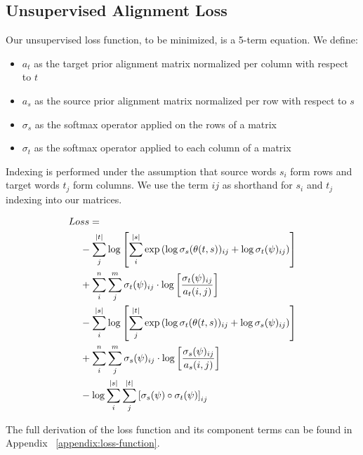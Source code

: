 \documentclass[twoside,twocolumn]{article}
\begin{document}
\subsection{Unsupervised Alignment Loss}


Our unsupervised loss function, to be minimized, is a 5-term equation.
We define:
\begin{itemize}[label={}]
  \item $a_t$ as the target prior alignment matrix normalized per column with respect to $t$\\ %
  \item $a_s$ as the source prior alignment matrix normalized per row with respect to $s$\\ %
  \item $\sigma_s$ as the softmax operator applied on the rows of a matrix\\
  \item $\sigma_t$ as the softmax operator applied to each column of a matrix
\end{itemize}

Indexing is performed under the assumption that source words $s_i$ form rows
and target words $t_j$ form columns. We use the term $ij$ as shorthand
for $s_i$ and $t_j$ indexing into our matrices.

\begin{equation}
  \centering
\begin{split}
  Lo&ss = \\
  &- \sum_j^{|t|} \log \left[
      \sum_i^{|s|} \exp \left(
        \log \sigma_s(\theta(t, s))_{ij} + \log \sigma_t(\psi)_{ij} \right)
    \right] \\
  &+ \sum_i^n \sum_j^m \sigma_t(\psi)_{ij} \cdot \log \left[
    \frac{\sigma_t(\psi)_{ij}}{a_t(i, j)} \right] \\
  &- \sum_i^{|s|} \log \left[ \sum_j^{|t|}
      \exp \left(
        \log \sigma_t(\theta(t, s))_{ij} + \log \sigma_s(\psi)_{ij}
      \right)
    \right] \\
  &+ \sum_i^n \sum_j^m \sigma_s(\psi)_{ij} \cdot \log \left[
    \frac{\sigma_s(\psi)_{ij}}{a_s(i, j)} \right] \\
  &- \log \sum_i^{|s|} \sum_j^{|t|} \left[
    \sigma_s(\psi) \circ \sigma_t(\psi) \right]_{ij} \\
\end{split}
\end{equation}

The full derivation of the loss function and its component terms can be found in
Appendix ~\ref{appendix:loss-function}.
\end{document}
